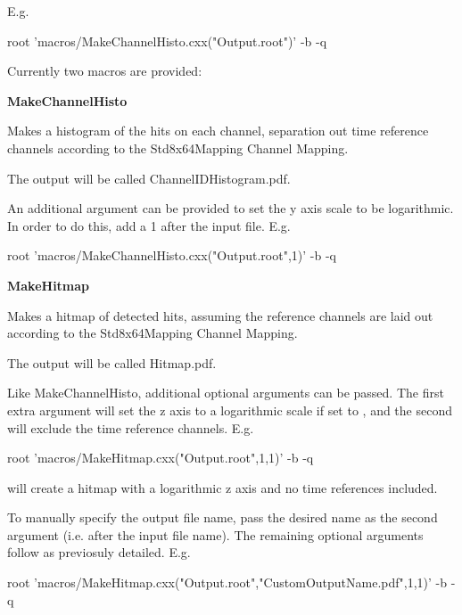 E.\+g. 
\begin{DoxyCode}
root 'macros/MakeChannelHisto.cxx("Output.root")' -b -q
\end{DoxyCode}


Currently two macros are provided\+:


\begin{DoxyItemize}
\item {\bfseries Make\+Channel\+Histo}
\end{DoxyItemize}

Makes a histogram of the hits on each channel, separation out time reference channels according to the {\ttfamily Std8x64\+Mapping} Channel Mapping.

The output will be called {\ttfamily Channel\+I\+D\+Histogram.\+pdf}.

An additional argument can be provided to set the y axis scale to be logarithmic. In order to do this, add a 1 after the input file. E.\+g. 
\begin{DoxyCode}
root 'macros/MakeChannelHisto.cxx("Output.root",1)' -b -q
\end{DoxyCode}



\begin{DoxyItemize}
\item {\bfseries Make\+Hitmap}
\end{DoxyItemize}

Makes a hitmap of detected hits, assuming the reference channels are laid out according to the {\ttfamily Std8x64\+Mapping} Channel Mapping.

The output will be called {\ttfamily Hitmap.\+pdf}.

Like {\ttfamily Make\+Channel\+Histo}, additional optional arguments can be passed. The first extra argument will set the z axis to a logarithmic scale if set to {}, and the second will exclude the time reference channels. E.\+g. 
\begin{DoxyCode}
root 'macros/MakeHitmap.cxx("Output.root",1,1)' -b -q
\end{DoxyCode}
 will create a hitmap with a logarithmic z axis and no time references included.

To manually specify the output file name, pass the desired name as the second argument (i.\+e. after the input file name). The remaining optional arguments follow as previosuly detailed. E.\+g. 
\begin{DoxyCode}
root 'macros/MakeHitmap.cxx("Output.root","CustomOutputName.pdf",1,1)' -b -q
\end{DoxyCode}


